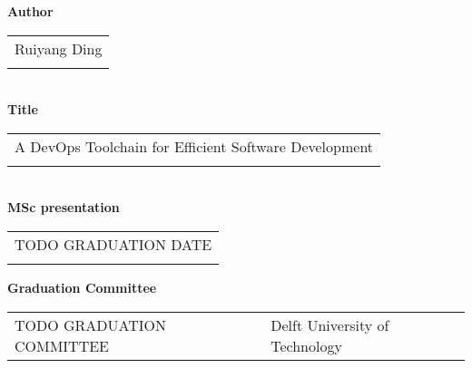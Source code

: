 \thispagestyle{empty}

\noindent \textbf{Author}\\
\begin{tabular}{l}
Ruiyang Ding\\
\\
\end{tabular}\\
\noindent \textbf{Title}\\
\begin{tabular}{l}
A DevOps Toolchain for Efficient Software Development\\
\\
\end{tabular}\\
\noindent \textbf{MSc presentation}\\
\begin{tabular}{l}
TODO GRADUATION DATE\\
\\
\end{tabular}

\vspace{1.1cm}

\noindent \textbf{Graduation Committee}\\
\begin{tabular}{ll}
TODO GRADUATION COMMITTEE & Delft University of Technology \\
\end{tabular}

